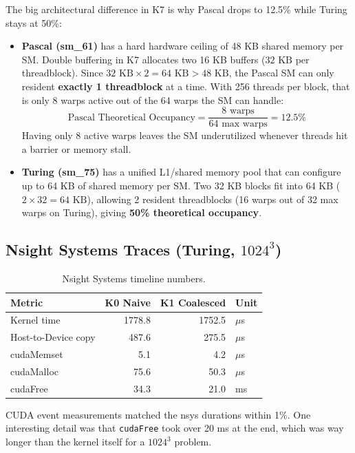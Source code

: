 \documentclass[11pt]{article}
\begin{document}
The big architectural difference in K7 is why Pascal drops to 12.5\% while Turing stays at 50\%:
\begin{itemize}
    \item \textbf{Pascal (sm\_61)} has a hard hardware ceiling of 48 KB shared memory per SM. Double buffering in K7 allocates two 16 KB buffers ($32\text{ KB}$ per threadblock). Since $32\text{ KB} \times 2 = 64\text{ KB} > 48\text{ KB}$, the Pascal SM can only resident \textbf{exactly 1 threadblock} at a time. With 256 threads per block, that is only 8 warps active out of the 64 warps the SM can handle:
    \[
    \text{Pascal Theoretical Occupancy} = \frac{8\text{ warps}}{64\text{ max warps}} = \mathbf{12.5\%}
    \]
    Having only 8 active warps leaves the SM underutilized whenever threads hit a barrier or memory stall.
    \item \textbf{Turing (sm\_75)} has a unified L1/shared memory pool that can configure up to 64 KB of shared memory per SM. Two 32 KB blocks fit into 64 KB ($2 \times 32 = 64\text{ KB}$), allowing 2 resident threadblocks (16 warps out of 32 max warps on Turing), giving \textbf{50\% theoretical occupancy}.
\end{itemize}

\subsection{Nsight Systems Traces (Turing, $1024^3$)}

\begin{table}[h]
\centering
\begin{tabular}{|l|r|r|l|}
\hline
\textbf{Metric} & \textbf{K0 Naive} & \textbf{K1 Coalesced} & \textbf{Unit} \\
\hline
Kernel time & 1778.8 & 1752.5 & $\mu$s \\
Host-to-Device copy & 487.6 & 275.5 & $\mu$s \\
cudaMemset & 5.1 & 4.2 & $\mu$s \\
cudaMalloc & 75.6 & 50.3 & $\mu$s \\
cudaFree & 34.3 & 21.0 & ms \\
\hline
\end{tabular}
\caption{Nsight Systems timeline numbers.}
\end{table}

CUDA event measurements matched the nsys durations within 1\%. One interesting detail was that \texttt{cudaFree} took over 20 ms at the end, which was way longer than the kernel itself for a $1024^3$ problem.
\end{document}
